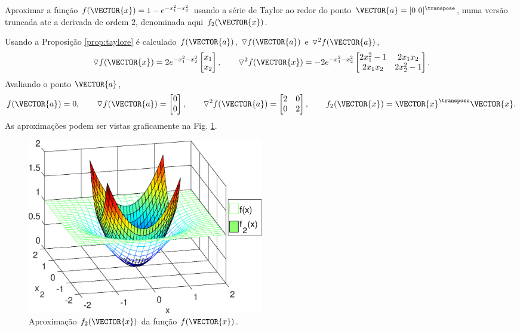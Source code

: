 \begin{example}
Aproximar a função $f(\VECTOR{x})=1-e^{-x_1^2-x_2^2}$ usando a série de Taylor ao redor do ponto $\VECTOR{a}=[0~ 0]^{\transpose}$,
numa versão truncada ate a derivada de ordem $2$,
denominada aqui $f_2(\VECTOR{x})$.
\end{example}
\begin{SolutionT}
Usando a Proposição \ref{prop:taylore} é calculado $f(\VECTOR{a})$, 
$\triangledown f(\VECTOR{a})$ e $\triangledown^2 f(\VECTOR{a})$,
\begin{equation}
\triangledown f(\VECTOR{x}) = 
2 e^{-x_1^2-x_2^2}
\begin{bmatrix}
x_1 \\
x_2
\end{bmatrix},
\qquad 
\triangledown^2 f(\VECTOR{x}) = 
-2 e^{-x_1^2-x_2^2}
\begin{bmatrix}
2 x_1^2-1 & 2 x_1 x_2\\
2 x_1 x_2 & 2 x_2^2-1
\end{bmatrix}.
\end{equation}
Avaliando o ponto $\VECTOR{a}$,
\begin{equation}
f(\VECTOR{a})=0,
\qquad 
\triangledown f(\VECTOR{a}) = 
\begin{bmatrix}
0 \\
0
\end{bmatrix},
\qquad 
\triangledown^2 f(\VECTOR{a}) = 
\begin{bmatrix}
2 & 0\\
0 & 2
\end{bmatrix},
\qquad 
f_2(\VECTOR{x}) = 
\VECTOR{x}^{\transpose}\VECTOR{x}.
\end{equation}
As aproximações podem ser vistas graficamente na Fig. \ref{fig:taylorf}.
\end{SolutionT}


\begin{figure}[!h]
  \centering
    \includegraphics[width=0.5\textwidth]{chapters/funcoes/mcode/taylorR2R1/taylorf.eps}
  \caption{Aproximação $f_2(\VECTOR{x})$ da função $f(\VECTOR{x})$.}
    \label{fig:taylorf}
\end{figure}
 
